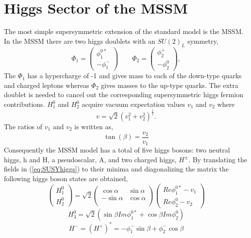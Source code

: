 \section{Higgs Sector of the MSSM}
The most simple supersymmetric extension of the standard model is the MSSM.
In the MSSM there are two higgs doublets with an $SU(2)_{L}$ symmetry,
\begin{equation}
\Phi_{1}=
\left(
    \begin{array}{c}
      \phi_{1}^{0*} \\
      -\phi_{1}^{-}
    \end{array}
  \right) 
 \qquad
\Phi_{2}=
\left(
    \begin{array}{c}
      \phi_{2}^{+} \\
      -\phi_{2}^{0}
    \end{array}
  \right), 
  \label{eq:SUSYhiggs}
\end{equation}
The $\Phi_{1}$ has a hypercharge of -1 and gives mass to each of the
down-type quarks and charged leptons whereas $\Phi_{2}$ gives masses
to the up-type quarks. The extra doublet
is needed to cancel out the corresponding supersymmetric higgs fermion
contributions.
$H_{1}^{0}$ and $H_{2}^{0}$ acquire vacuum expectation values $v_{1}$ and $v_{2}$ where
\begin{equation}
v = \sqrt{2}(v_{1}^{2}+v_{2}^{2})^{\frac{1}{2}}.
\end{equation}
The ratios of $v_{1}$ and $v_{2}$ is written as,
\begin{equation}
\tan(\beta)=\frac{v_{2}}{v_{1}}
\end{equation}
Consequently the MSSM model has a total of five higgs bosons: two neutral higgs, h and H,
a pseudoscalar, A, and two charged higgs, $H^{\pm}$.
By translating the fields in (\ref{eq:SUSYhiggs}) to their minima and diagonalizing the matrix
the following higgs boson states are obtained,
\begin{equation}
\left(
    \begin{array}{c}
      H^{0}_{1} \\
     H^{0}_{2}
    \end{array}
  \right) 
  =
  \sqrt{2}
  \begin{pmatrix}
  \cos{\alpha} & \sin{\alpha}\\
  -\sin{\alpha}& \cos{\alpha}\\
  \end{pmatrix}
\left(
      \begin{array}{c}
      Re{\phi}_{1}^{0*}-v_{1} \\
     Re{\phi}_{2}^{0}-v_{2}
    \end{array}
  \right) 
\end{equation}
\begin{equation}
H_{3}^{0}=\sqrt{2}(\sin{\beta}Im\phi_{1}^{0*}+\cos{\beta}Im\phi^{0}_{2})
\end{equation}
\begin{equation}
H^{-}=(H^{+})^{*}=-\phi_{1}^{-}\sin{\beta}+\phi_{2}^{-}\cos{\beta}
\end{equation}

